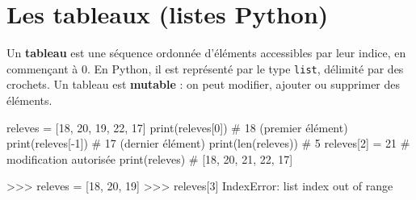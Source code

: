 \section{Les tableaux (listes Python)}
\label{sec:tableaux}


\begin{nxdef}[D4]
  Un \textbf{tableau} est une séquence ordonnée d'éléments accessibles par leur indice,
  en commençant à 0. En Python, il est représenté par le type \lstinline{list},
  délimité par des crochets. Un tableau est \textbf{mutable} : on peut modifier, ajouter
  ou supprimer des éléments.
\end{nxdef}


\begin{python}
releves = [18, 20, 19, 22, 17]
print(releves[0])      # 18  (premier élément)
print(releves[-1])     # 17  (dernier élément)
print(len(releves))    # 5
releves[2] = 21        # modification autorisée
print(releves)         # [18, 20, 21, 22, 17]
\end{python}



\begin{console}
>>> releves = [18, 20, 19]
>>> releves[3]
IndexError: list index out of range
\end{console}

